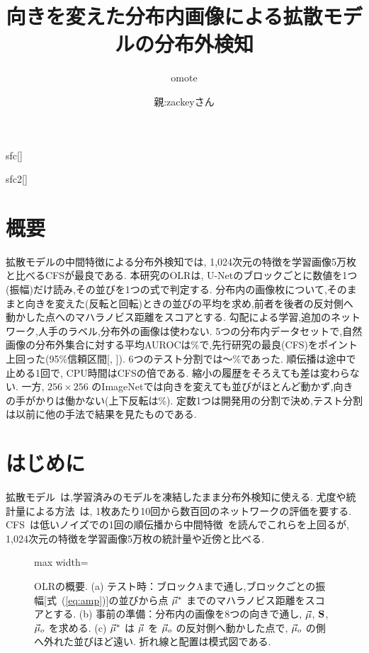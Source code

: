 \documentclass[MIRU,submit]{miru2025j}
\makeatletter
\newcommand{\Ours}{OLR}   %
\renewcommand{\eqref}[1]{(\ref{#1})}   %
\renewenvironment{figure*}{\@floatenv\capwidth\textwidth\ecapwidth\textwidth\abovecaptionskip1mm\belowcaptionskip\z@\@dblfloat{figure}}{\end@dblfloat}
\makeatother
\begin{document}
\title{\textbf{向きを変えた分布内画像による拡散モデルの分布外検知}}
\author{omote}{}{sfc}[]
\author{親:zackeyさん}{}{sfc2}[]
\maketitle

\section*{概要}
拡散モデルの中間特徴による分布外検知では, 1{,}024次元の特徴を学習画像5万枚と比べるCFSが最良である. 本研究の\Ours{}は, U-Netのブロックごとに数値を1つ(振幅)だけ読み,その並びを1つの式で判定する. 分布内の画像\olNRefMax{}枚について,そのままと向きを変えた(反転と回転)ときの並びの平均を求め,前者を後者の反対側へ動かした点へのマハラノビス距離をスコアとする. 勾配による学習,追加のネットワーク,人手のラベル,分布外の画像は使わない. 5つの分布内データセットで,自然画像の分布外集合に対する平均AUROCは\olTestOL\%で,先行研究の最良(CFS)を\olGapCfsKnn{}ポイント上回った(95\%信頼区間[\olGapCfsKnnLo, \olGapCfsKnnHi]). 6つのテスト分割では\olSixMin{}〜\olSixMax\%であった. 順伝播は途中で止める1回で, CPU時間はCFSの\olSecRatioCfsKnn{}倍である. 縮小の履歴をそろえても差は変わらない. 一方, $256{\times}256$ のImageNetでは向きを変えても並びがほとんど動かず,向きの手がかりは働かない(上下反転は\olHrOLVf\%). 定数1つは開発用の分割で決め,テスト分割は以前に他の手法で結果を見たものである.
\section{はじめに}
拡散モデル~\cite{song2021score,karras2022edm}は,学習済みのモデルを凍結したまま分布外検知に使える. 尤度や統計量による方法~\cite{serra2020input,mahmood2021msma,heng2024diffpath,alexis2026gepc,shoushtari2026eigenscore}は, 1枚あたり10回から数百回のネットワークの評価を要する. CFS~\cite{rouzoumka2026cfs}は低いノイズでの1回の順伝播から中間特徴~\cite{xiang2023ddae}を読んでこれらを上回るが, 1{,}024次元の特徴を学習画像5万枚の統計量や近傍と比べる.

\begin{figure}[t]\centering
\begin{adjustbox}{max width=\textwidth}\end{adjustbox}
\caption{\Ours{}の概要. (a) テスト時：ブロックAまで通し,ブロックごとの振幅[式~\eqref{eq:amp}]の並びから点 $\vec{\mu}^{*}$ までのマハラノビス距離をスコアとする. (b) 事前の準備：分布内の画像を8つの向きで通し, $\vec{\mu}$, $\mathbf{S}$, $\vec{\mu}_{o}$ を求める. (c) $\vec{\mu}^{*}$ は $\vec{\mu}$ を $\vec{\mu}_{o}$ の反対側へ動かした点で, $\vec{\mu}_{o}$ の側へ外れた並びほど遠い. 折れ線と配置は模式図である.}
\label{fig:method}
\end{figure}
\end{document}
